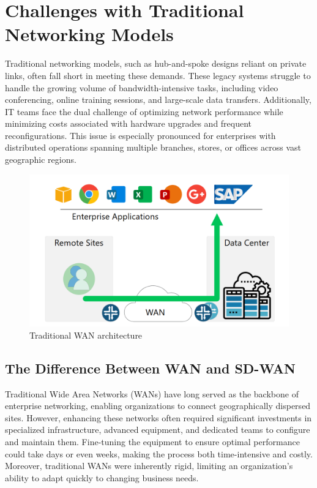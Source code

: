 \documentclass[12pt,english]{report}
\begin{document}
\section{Challenges with Traditional Networking Models}
Traditional networking models, such as hub-and-spoke designs reliant on private links, often fall short in meeting these demands. These legacy systems struggle to handle the growing volume of bandwidth-intensive tasks, including video conferencing, online training sessions, and large-scale data transfers. Additionally, IT teams face the dual challenge of optimizing network performance while minimizing costs associated with hardware upgrades and frequent reconfigurations. This issue is especially pronounced for enterprises with distributed operations spanning multiple branches, stores, or offices across vast geographic regions\cite{ref3}.
\begin{figure}[H]
    \centering
    \includegraphics[width= 1 \textwidth]{chapter1/trad-wan.png}
    \caption{Traditional WAN architecture\cite{ref3}}
    \label{fig: Traditional WAN architecture}
\end{figure}

\subsection{{The Difference Between WAN and SD-WAN}}
Traditional Wide Area Networks (WANs) have long served as the backbone of enterprise networking, enabling organizations to connect geographically dispersed sites. However, enhancing these networks often required significant investments in specialized infrastructure, advanced equipment, and dedicated teams to configure and maintain them. Fine-tuning the equipment to ensure optimal performance could take days or even weeks, making the process both time-intensive and costly. Moreover, traditional WANs were inherently rigid, limiting an organization’s ability to adapt quickly to changing business needs.
\end{document}
